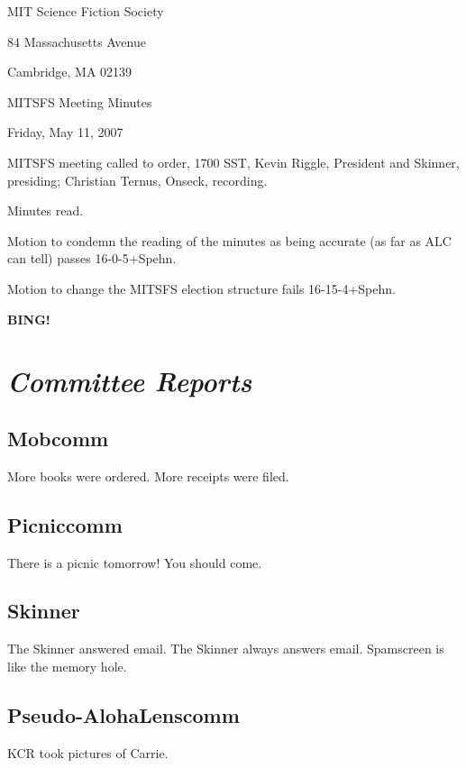 \documentclass[10pt]{article}
\newcommand{\bing}{{\bf BING!} }
\newcommand{\goto}[1]{\bing \vskip 12pt \section*{{\em{#1}}}}
\begin{document}
\begin{center}

MIT Science Fiction Society

84 Massachusetts Avenue

Cambridge, MA 02139

\vspace{12pt}

MITSFS Meeting Minutes

Friday, May 11, 2007

\end{center}

\vspace{18pt}

\setlength{\parskip}{6pt}

\noindent
MITSFS meeting called to order, 1700 SST,
Kevin Riggle, President and Skinner, presiding; Christian Ternus, Onseck, recording.

Minutes read.

Motion to condemn the reading of the minutes as being accurate (as far as ALC can tell) passes 16-0-5+Spehn.

Motion to change the MITSFS election structure fails 16-15-4+Spehn.

\goto{Committee Reports}

\subsection*{Mobcomm}

More books were ordered.  More receipts were filed.

\subsection*{Picniccomm}

There is a picnic tomorrow!  You should come.

\subsection*{Skinner}

The Skinner answered email.  The Skinner always answers email.  Spamscreen is like the memory hole.

\subsection*{Pseudo-AlohaLenscomm}

KCR took pictures of Carrie.
\end{document}
